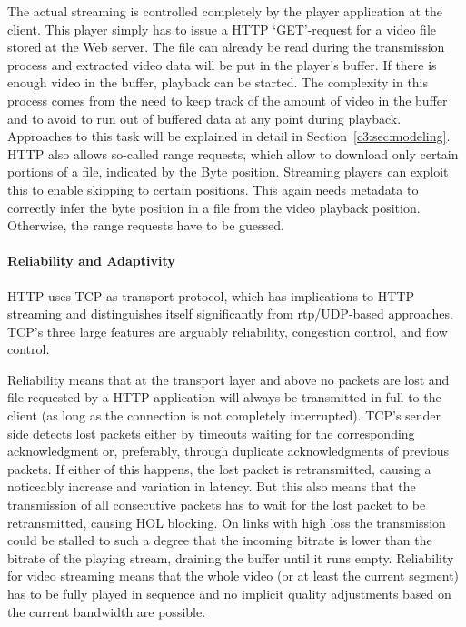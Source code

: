 The actual streaming is controlled completely by the player application at the client. This player simply has to issue a \gls{HTTP} `GET'-request for a video file stored at the Web server. The file can already be read during the transmission process and extracted video data will be put in the player's buffer. If there is enough video in the buffer, playback can be started. The complexity in this process comes from the need to keep track of the amount of video in the buffer and to avoid to run out of buffered data at any point during playback. Approaches to this task will be explained in detail in Section~\ref{c3:sec:modeling}. \gls{HTTP} also allows so-called range requests, which allow to download only certain portions of a file, indicated by the Byte position. Streaming players can exploit this to enable skipping to certain positions. This again needs metadata to correctly infer the byte position in a file from the video playback position. Otherwise, the range requests have to be guessed. 


\paragraph{Reliability and Adaptivity}

\gls{HTTP} uses \gls{TCP} as transport protocol, which has implications to \gls{HTTP} streaming and distinguishes itself significantly from \gls{rtp}/\gls{UDP}-based approaches. \gls{TCP}'s three large features are arguably reliability, congestion control, and flow control.

Reliability means that at the transport layer and above no packets are lost and file requested by a \gls{HTTP} application will always be transmitted in full to the client (as long as the connection is not completely interrupted). \gls{TCP}'s sender side detects lost packets either by timeouts waiting for the corresponding acknowledgment or, preferably, through duplicate acknowledgments of previous packets. If either of this happens, the lost packet is retransmitted, causing a noticeably increase and variation in latency. But this also means that the transmission of all consecutive packets has to wait for the lost packet to be retransmitted, causing \gls{HOL} blocking. On links with high loss the transmission could be stalled to such a degree that the incoming bitrate is lower than the bitrate of the playing stream, draining the buffer until it runs empty. Reliability for video streaming means that the whole video (or at least the current segment) has to be fully played in sequence and no implicit quality adjustments based on the current bandwidth are possible.

